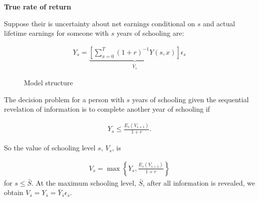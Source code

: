 \begin{frame}\begin{center}
	\LARGE\textbf{True rate of return}
\end{center}\end{frame}
\begin{frame}
Suppose their is uncertainty about net earnings conditional on $s$ and actual lifetime earnings for someone with $s$ years of schooling are:

\begin{align*}
Y_s = \underbrace{\left[\sum^T_{x = 0}(1 + r)^{-1} Y(s, x)\right]}_{\bar{Y}_s}\epsilon_s
\end{align*}
\end{frame}
\begin{frame}
\begin{figure}[htp]\centering
\caption{Model structure}
\end{figure}
\end{frame}
\begin{frame}
The decision problem for a person with $s$ years of schooling given the sequential revelation of information is to complete another year of schooling if

\begin{align*}
Y_s \leq \frac{E_s(V_{s+1})}{1 + r}.
\end{align*}

\end{frame}
\begin{frame}
So the value of schooling level $s$, $V_s$, is

\begin{align*}
V_s = \max\left\{Y_s, \frac{E_s(V_{s+1})}{1 + r}\right\}
\end{align*}
for $s \leq \bar{S}$. At the maximum schooling level, $\bar{S}$, after all information is revealed, we obtain $V_{\bar{s}} = Y_{\bar{s}} = \bar{Y}_{\bar{s}}\epsilon_{\bar{s}}$.

\end{frame}
